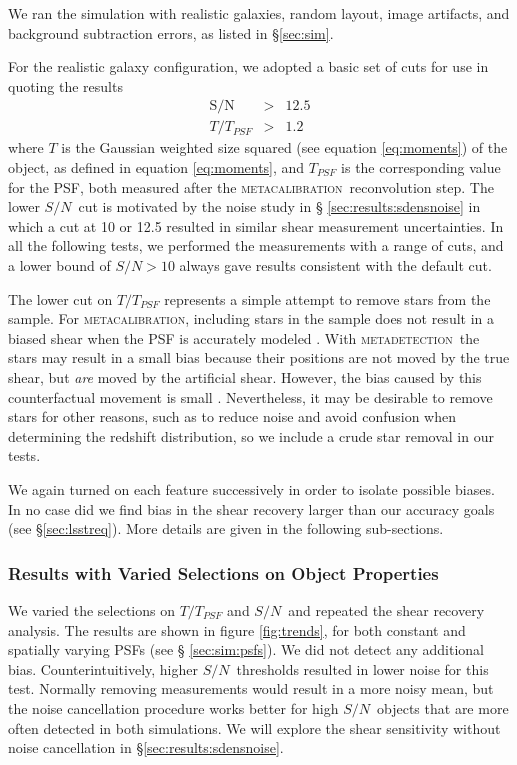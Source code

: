 \documentclass[twocolumn,twocolappendix,astrosym]{openjournal}
\newcommand{\snr}{$S/N$}
\newcommand{\mcal}{\textsc{metacalibration}}
\newcommand{\mdet}{\textsc{metadetection}}
\begin{document}
We ran the simulation with realistic galaxies, random layout, image
artifacts, and background subtraction errors, as listed in \S \ref{sec:sim}.

For the realistic galaxy configuration, we adopted a basic set of cuts for use
in quoting the results
\begin{eqnarray} \label{eq:basiccuts}
    \mathrm{S/N} & > & 12.5 \\
    T/T_{PSF} & > & 1.2
\end{eqnarray}
where $T$ is the Gaussian weighted size squared (see equation \ref{eq:moments})
of the object, as defined in equation \ref{eq:moments}, and $T_{PSF}$
is the corresponding value for the PSF, both measured after the \mcal\
reconvolution step. The lower \snr\ cut is motivated by the noise study in \S
\ref{sec:results:sdensnoise} in which a cut at 10 or 12.5 resulted in similar
shear measurement uncertainties. In all the following tests, we performed the
measurements with a range of cuts, and a lower bound of $S/N > 10$ always gave
results consistent with the default cut.

The lower cut on $T/T_{PSF}$ represents a simple attempt to remove stars from
the sample.  For \mcal, including stars in the sample does not result in a
biased shear when the PSF is accurately modeled \citep{SheldonMcal2017}.  With
\mdet\ the stars may result in a small bias because their positions are not
moved by the true shear, but {\it are} moved by the artificial shear. However,
the bias caused by this counterfactual movement is small \citep{mdet20}.
Nevertheless, it may be desirable to remove stars for other reasons, such as to
reduce noise and avoid confusion when determining the redshift distribution, so
we include a crude star removal in our tests.

We again turned on each feature successively in order to isolate possible
biases.  In no case did we find bias in the shear recovery larger than our
accuracy goals (see \S \ref{sec:lsstreq}).  More details are given in the
following sub-sections.

\subsubsection{Results with Varied Selections on Object Properties} \label{sec:results:select}

We varied the selections on $T/T_{PSF}$ and \snr\ and
repeated the shear recovery analysis.  The results are shown in figure
\ref{fig:trends}, for both constant and spatially varying PSFs (see \S
\ref{sec:sim:psfs}).  We did not detect any additional bias.
Counterintuitively, higher \snr\ thresholds resulted in lower noise for this
test.  Normally removing measurements would result in a more noisy mean, but
the noise cancellation procedure works better for high \snr\ objects that are
more often detected in both simulations.  We will explore the shear sensitivity
without noise cancellation in \S \ref{sec:results:sdensnoise}.
\end{document}
